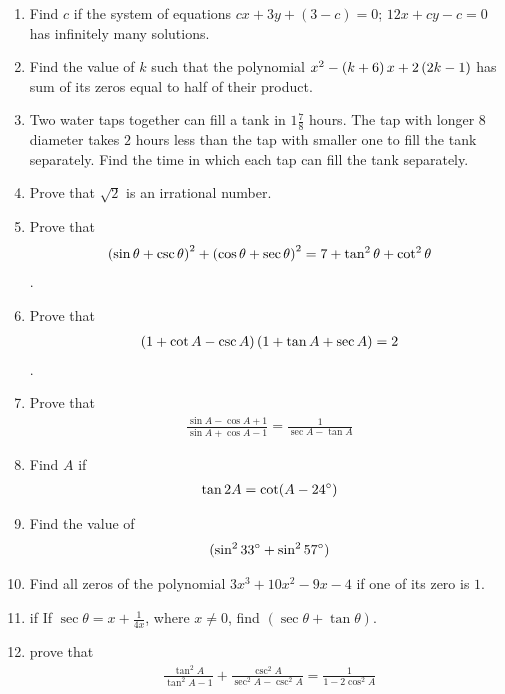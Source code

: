 \begin{enumerate}
  \item Find $c$ if the system of equations $cx+3y+(3-c)=0$; $12x+cy-c=0$ has infinitely many solutions.
  \item Find the value of $k$ such that the polynomial $x^2-\left(k+6\right)x+2\left(2k-1\right)$ has sum of its zeros equal to half of their product.
  \item Two water taps together can fill a tank in $1\frac{7}{8}$ hours. The tap with longer $8$ diameter takes $2$ hours less than the tap with smaller one to fill the tank separately. Find the time in which each tap can fill the tank separately.
  
  
  
  
  \item Prove that $\sqrt{2}$ is an irrational number.
  \item Prove that \begin{align*} \left(\sin\theta + \csc\theta\right)^2 + \left(\cos\theta + \sec\theta\right)^2 = 7 + \tan^2\theta + \cot^2\theta\end{align*}.
  \item Prove that \begin{align*}\left(1+\cot A - \csc A\right) \left(1 + \tan A +\sec A\right) = 2 \end{align*}.
  \item Prove that \begin{align*} \frac{\sin A-\cos A+1}{\sin A+ \cos A-1} =\frac{1}{\sec A-\tan A}\end{align*}
  \item Find $A$ if \begin{align*}\tan 2A = \cot (A-24\degree)\end{align*}
  \item Find the value of \begin{align*}(\sin^2 33\degree+ \sin^2 57\degree)\end{align*}
  
  
  \item Find all zeros of the polynomial $3x ^ 3 + 10x ^ 2 - 9x - 4$ if one of its zero is $1$.
   
  \item if If $\sec\theta = x + \frac{1}{4x}$, where $x \neq 0$, find $(\sec\theta + \tan\theta)$.
  \item prove that \begin{align*} \frac{\tan^2A}{\tan^2 A-1}+\frac{\csc^2 A}{\sec^2 A-\csc^2 A}=\frac{1}{1-2\cos^2 A}\end{align*}
\end{enumerate}
